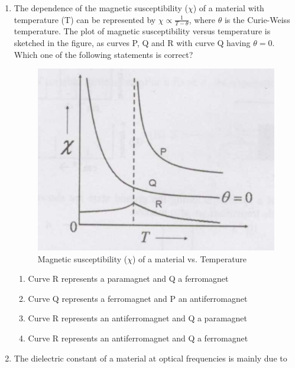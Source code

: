 \documentclass[14pt, a4paper]{extarticle}
\begin{document}
\begin{enumerate}[label=\textbf{Q. \arabic*}, start=21]
\item The dependence of the magnetic susceptibility ($\chi$) of a material with temperature (T) can be represented by $\chi \propto \frac{1}{T-\theta}$, where $\theta$ is the Curie-Weiss temperature.
The plot of magnetic susceptibility versus temperature is sketched in the figure, as curves P, Q and R with curve Q having $\theta=0$.
Which one of the following statements is correct?
\begin{figure}[H]
\centering
\includegraphics[width=0.5\columnwidth]{figs/Q27figs.png}
\caption{Magnetic susceptibility ($\chi$) of a material vs. Temperature}
\label{fig:q27}
\end{figure}
\begin{enumerate}
\item Curve R represents a paramagnet and Q a ferromagnet
\item Curve Q represents a ferromagnet and P an antiferromagnet
\item Curve R represents an antiferromagnet and Q a paramagnet
\item Curve R represents an antiferromagnet and Q a ferromagnet
\end{enumerate}

\item The dielectric constant of a material at optical frequencies is mainly due to
\begin{enumerate}
\end{enumerate}


\end{enumerate}
\end{document}
